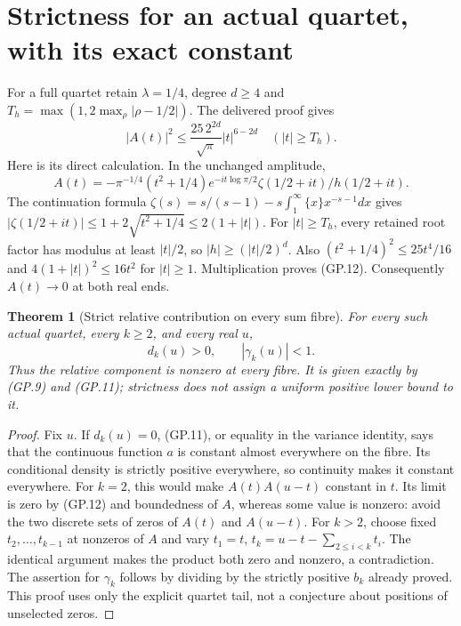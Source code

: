 \documentclass[11pt]{article}
\newtheorem{theorem}{Theorem}
\begin{document}
\section{Strictness for an actual quartet, with its exact constant}
For a full quartet retain $\lambda=1/4$, degree $d\geq4$ and
$T_h=\max(1,2\max_\rho|\rho-1/2|)$. The delivered proof gives
\begin{equation}
 |A(t)|^2\leq \frac{25\,2^{2d}}{\sqrt\pi}|t|^{6-2d}
                  \quad (|t|\geq T_h).
 \tag{GP.12}
\end{equation}
Here is its direct calculation. In the unchanged amplitude,
\[
 A(t)=-\pi^{-1/4}(t^2+1/4)e^{-it\log\pi/2}
                    \zeta(1/2+it)/h(1/2+it).
\]
The continuation formula
$\zeta(s)=s/(s-1)-s\int_1^\infty\{x\}x^{-s-1}dx$
gives $|\zeta(1/2+it)|\leq1+2\sqrt{t^2+1/4}
\leq2(1+|t|)$. For $|t|\geq T_h$, every retained root factor has
modulus at least $|t|/2$, so $|h|\geq(|t|/2)^d$.
Also $(t^2+1/4)^2\leq25t^4/16$ and
$4(1+|t|)^2\leq16t^2$ for $|t|\geq1$. Multiplication proves
(GP.12). Consequently $A(t)\to0$ at both real ends.

\begin{theorem}[Strict relative contribution on every sum fibre]
For every such actual quartet, every $k\geq2$, and every real $u$,
\begin{equation}
 d_k(u)>0,\qquad |\gamma_k(u)|<1.
 \tag{GP.13}
\end{equation}
Thus the relative component is nonzero at every fibre. It is given
exactly by (GP.9) and (GP.11); strictness does not assign a uniform
positive lower bound to it.
\end{theorem}
\begin{proof}
Fix $u$. If $d_k(u)=0$, (GP.11), or equality in the variance
identity, says that the continuous function $a$ is constant almost
everywhere on the fibre. Its conditional density is strictly positive
everywhere, so continuity makes it constant everywhere. For $k=2$,
this would make $A(t)A(u-t)$ constant in $t$. Its limit is zero
by (GP.12) and boundedness of $A$, whereas some value is nonzero:
avoid the two discrete sets of zeros of $A(t)$ and $A(u-t)$.
For $k>2$, choose fixed $t_2,\ldots,t_{k-1}$ at nonzeros of $A$
and vary $t_1=t$, $t_k=u-t-\sum_{2\leq i<k}t_i$. The identical
argument makes the product both zero and nonzero, a contradiction.
The assertion for $\gamma_k$ follows by dividing by the strictly
positive $b_k$ already proved. This proof uses only the explicit
quartet tail, not a conjecture about positions of unselected zeros.
\end{proof}
\end{document}

